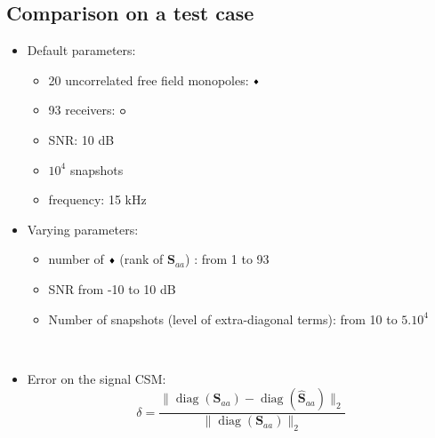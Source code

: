 \documentclass[9pt,xcolor=x11names,compress, notes=show]{beamer}%
\newcommand{\diag}[1]{\operatorname{diag}\left(#1\right)}
\begin{document}
\subsection{Comparison on a test case}
\begin{frame}{\insertsectionhead}
	
	\begin{itemize}
	\item Default parameters:
		\noindent\begin{minipage}{\linewidth}
		     	\begin{minipage}{0.4\linewidth}		     		
	         			\begin{itemize}
					\item 20  uncorrelated free field monopoles: \textcolor{red}{$\vcenter{\hbox{\tiny$\blacklozenge$}}$}
					\item 93 receivers: \textcolor{colorAlice}{$\vcenter{\hbox{\small$\bm{\circ}$}}$}
					\item SNR: 10 dB
					\item $10^4$ snapshots
					\item frequency: 15 kHz
				\end{itemize}	
	               		\vfill
	     		\end{minipage}
	      		\hfill
	     		 \begin{minipage}{0.5\linewidth}
             			\centering
             			\vspace{-0.5cm}
				
	      		\end{minipage}
		\end{minipage}
	
	\item Varying parameters: \\
	\begin{itemize}
	        \item number of   \textcolor{red}{$\vcenter{\hbox{\tiny$\blacklozenge$}}$} (rank of $\bm{S}_{aa}$) : from 1 to 93\\[3pt]
	        \item SNR from -10 to 10 dB\\[3pt]
	        \item Number of snapshots (level of extra-diagonal terms): from 10 to $5.10^4$
\end{itemize}~\\	
	
	\item Error on the signal CSM:
	\begin{equation*}
   		 \delta = \frac{\|\diag{\bm{S}_{aa}}  - \diag{\bm{\hat{S}}_{aa}}\|_2}{\|\diag{\bm{S}_{aa} } \|_2}
	\end{equation*}
	\end{itemize}

\end{frame}
\end{document}
